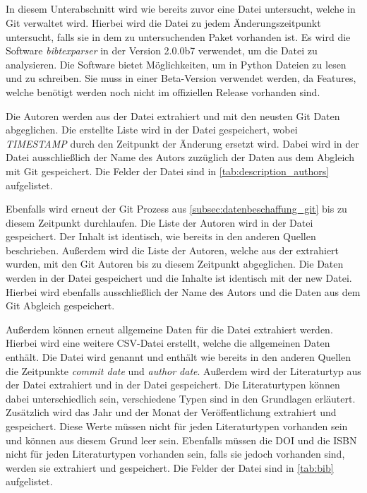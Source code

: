 \subsection{}
\label{subsec:datenbeschaffung_bibtex}
In diesem Unterabschnitt wird wie bereits zuvor eine Datei untersucht, welche in Git verwaltet wird.
Hierbei wird die  Datei zu jedem Änderungszeitpunkt untersucht, falls sie in dem zu untersuchenden Paket vorhanden ist.
Es wird die Software \emph{bibtexparser} in der Version 2.0.0b7 verwendet, um die  Datei zu analysieren.
Die Software bietet Möglichkeiten, um in Python  Dateien zu lesen und zu schreiben.
Sie muss in einer Beta-Version verwendet werden, da Features, welche benötigt werden noch nicht im offiziellen Release vorhanden sind.

Die Autoren werden aus der  Datei extrahiert und mit den neusten Git Daten abgeglichen.
Die erstellte Liste wird in der Datei  gespeichert, wobei \emph{TIMESTAMP} durch den Zeitpunkt der Änderung ersetzt wird.
Dabei wird in der Datei ausschließlich der Name des Autors zuzüglich der Daten aus dem Abgleich mit Git gespeichert.
Die Felder der Datei sind in \autoref{tab:description_authors} aufgelistet.

Ebenfalls wird erneut der Git Prozess aus \autoref{subsec:datenbeschaffung_git} bis zu diesem Zeitpunkt durchlaufen.
Die Liste der Autoren wird in der Datei  gespeichert.
Der Inhalt ist identisch, wie bereits in den anderen Quellen beschrieben.
Außerdem wird die Liste der Autoren, welche aus der  extrahiert wurden, mit den Git Autoren bis zu diesem Zeitpunkt abgeglichen.
Die Daten werden in der Datei  gespeichert und die Inhalte ist identisch mit der \glqq new\grqq{} Datei.
Hierbei wird ebenfalls ausschließlich der Name des Autors und die Daten aus dem Git Abgleich gespeichert.

Außerdem können erneut allgemeine Daten für die  Datei extrahiert werden.
Hierbei wird eine weitere CSV-Datei erstellt, welche die allgemeinen Daten enthält.
Die Datei wird  genannt und enthält wie bereits in den anderen Quellen die Zeitpunkte \emph{commit date} und \emph{author date}.
Außerdem wird der Literaturtyp aus der Datei extrahiert und in der Datei gespeichert.
Die Literaturtypen können dabei unterschiedlich sein, verschiedene Typen sind in den Grundlagen erläutert.
Zusätzlich wird das Jahr und der Monat der Veröffentlichung extrahiert und gespeichert.
Diese Werte müssen nicht für jeden Literaturtypen vorhanden sein und können aus diesem Grund leer sein.
Ebenfalls müssen die DOI und die ISBN nicht für jeden Literaturtypen vorhanden sein, falls sie jedoch vorhanden sind, werden sie extrahiert und gespeichert.
Die Felder der Datei sind in \autoref{tab:bib} aufgelistet.

